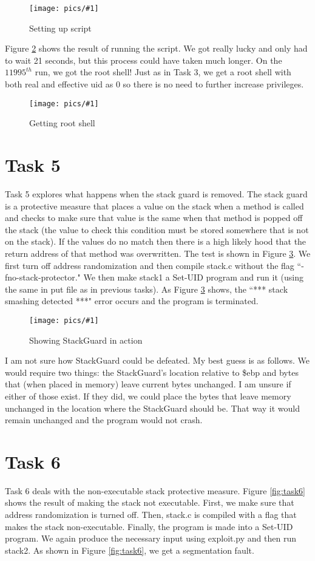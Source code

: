 \documentclass[11pt]{article}
\newcommand{\fig}[2]{ 
\begin{figure}[h]
	\centering
	\caption{#2}
	\texttt{[image: pics/\#1]}
	\label{fig:#1}
\end{figure} 
}
\begin{document}
\fig{task4.1}{Setting up script}

Figure \ref{fig:task4.2} shows the result of running the script. We got really lucky and only had to wait 21 seconds, but this process could have taken much longer. On the $11995^{th}$ run, we got the root shell! Just as in Task 3, we get a root shell with both real and effective uid as 0 so there is no need to further increase privileges.

\fig{task4.2}{Getting root shell}

\newpage

\section*{Task 5}

Task 5 explores what happens when the stack guard is removed. The stack guard is a protective measure that places a value on the stack when a method is called and checks to make sure that value is the same when that method is popped off the stack (the value to check this condition must be stored somewhere that is not on the stack). If the values do no match then there is a high likely hood that the return address of that method was overwritten. The test is shown in Figure \ref{fig:task5}. We first turn off address randomization and then compile stack.c without the flag ``-fno-stack-protector." We then make stack1 a Set-UID program and run it (using the same in put file as in previous tasks). As Figure \ref{fig:task5} shows, the ``*** stack smashing detected ***" error occurs and the program is terminated.

\fig{task5}{Showing StackGuard in action}

I am not sure how StackGuard could be defeated. My best guess is as follows. We would require two things: the StackGuard's location relative to \$ebp and bytes that (when placed in memory) leave current bytes unchanged. I am unsure if either of those exist. If they did, we could place the bytes that leave memory unchanged in the location where the StackGuard should be. That way it would remain unchanged and the program would not crash.

\newpage

\section*{Task 6}

Task 6 deals with the non-executable stack protective measure. Figure \ref{fig:task6} shows the result of making the stack not executable. First, we make sure that address randomization is turned off. Then, stack.c is compiled with a flag that makes the stack non-executable. Finally, the program is made into a Set-UID program. We again produce the necessary input using exploit.py and then run stack2. As shown in Figure \ref{fig:task6}, we get a segmentation fault.
\end{document}
